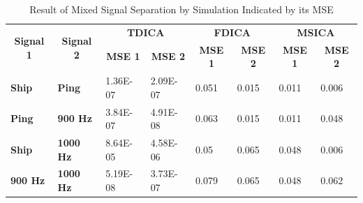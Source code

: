 \documentclass[a4paper]{jpconf}
\begin{document}
\begin{table}[b]
\centering
\caption{Result of Mixed Signal Separation by Simulation Indicated by its MSE}
\label{table:comparison}
\begin{tabular}{|l|l|l|l|l|l|l|l|}
\hline
\multicolumn{1}{|c|}{\multirow{2}{*}{\textbf{Signal 1}}} & \multicolumn{1}{c|}{\multirow{2}{*}{\textbf{Signal 2}}} & \multicolumn{2}{c|}{\textbf{TDICA}}                                       & \multicolumn{2}{c|}{\textbf{FDICA}}                                       & \multicolumn{2}{c|}{\textbf{MSICA}}                                       \\ \cline{3-8} 
\multicolumn{1}{|c|}{}                                   & \multicolumn{1}{c|}{}                                   & \multicolumn{1}{c|}{\textbf{MSE 1}} & \multicolumn{1}{c|}{\textbf{MSE 2}} & \multicolumn{1}{c|}{\textbf{MSE 1}} & \multicolumn{1}{c|}{\textbf{MSE 2}} & \multicolumn{1}{c|}{\textbf{MSE 1}} & \multicolumn{1}{c|}{\textbf{MSE 2}} \\ \hline
\textbf{Ship}                                            & \textbf{Ping}                                           & 1.36E-07                            & 2.09E-07                            & 0.051                               & 0.015                               & 0.011                               & 0.006                               \\ \hline
\textbf{Ping}                                            & \textbf{900 Hz}                                         & 3.84E-07                            & 4.91E-08                            & 0.063                               & 0.015                               & 0.011                               & 0.048                               \\ \hline
\textbf{Ship}                                            & \textbf{1000 Hz}                                        & 8.64E-05                            & 4.58E-06                            & 0.05                                & 0.065                               & 0.048                               & 0.006                               \\ \hline
\textbf{900 Hz}                                          & \textbf{1000 Hz}                                        & 5.19E-08                            & 3.73E-07                            & 0.079                               & 0.065                               & 0.048                               & 0.062                               \\ \hline

\end{tabular}
\end{table}
\end{document}
